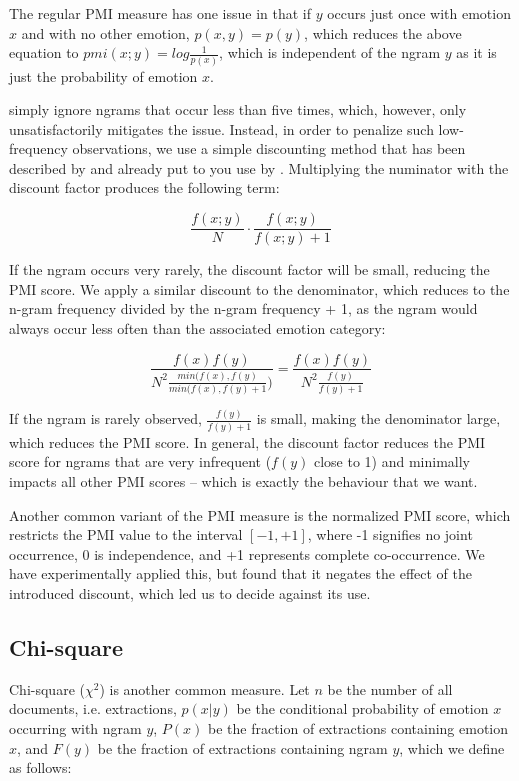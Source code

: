 The regular PMI measure has one issue in that if $y$ occurs just once with emotion $x$ and with no other emotion, $p(x,y) = p(y)$, which reduces the above equation to $pmi(x;y) = log \frac{1}{p(x)}$, which is independent of the ngram $y$ as it is just the probability of emotion $x$.

\citeauthor{twitter_hashtags_nrc} simply ignore ngrams that occur less than five times, which, however, only unsatisfactorily mitigates the issue. Instead, in order to penalize such low-frequency observations, we use a simple discounting method that has been described by \citeauthor{pmi_discount} and already put to you use by \citeauthor{matt_dissertation_pmi}. Multiplying the numinator with the discount factor produces the following term:

$$\frac{f(x;y)}{N} \cdot \frac{f(x;y)}{f(x;y) + 1}$$

If the ngram occurs very rarely, the discount factor will be small, reducing the PMI score. We apply a similar discount to the denominator, which reduces to the n-gram frequency divided by the n-gram frequency + 1, as the ngram would always occur less often than the associated emotion category:

$$\frac{f(x)f(y)}{N^{2}\frac{min(f(x),f(y)}{min(f(x),f(y) + 1})} = \frac{f(x)f(y)}{N^{2}\frac{f(y)}{f(y) + 1}}$$

If the ngram is rarely observed, $ \frac{f(y)}{f(y) + 1} $ is small, making the denominator large, which reduces the PMI score. In general, the discount factor reduces the PMI score for ngrams that are very infrequent ($f(y)$ close to 1) and minimally impacts all other PMI scores -- which is exactly the behaviour that we want.

Another common variant of the PMI measure is the normalized PMI score, which restricts the PMI value to the interval $[-1,+1]$, where -1 signifies no joint occurrence, 0 is independence, and +1 represents complete co-occurrence. We have experimentally applied this, but found that it negates the effect of the introduced discount, which led us to decide against its use.

\subsection{Chi-square}

Chi-square ($\chi^{2}$) is another common measure. Let $n$ be the number of all documents, i.e. extractions, $p(x|y)$ be the conditional probability of emotion $x$ occurring with ngram $y$, $P(x)$ be the fraction of extractions containing emotion $x$, and $F(y)$ be the fraction of extractions containing ngram $y$, which we define as follows:

